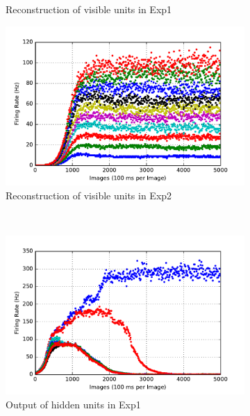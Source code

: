 \begin{figure}
\begin{subfigure}[t]{0.4\textwidth}
		\caption{Reconstruction of visible units in Exp1}
	\end{subfigure}
	\begin{subfigure}[t]{0.4\textwidth}
		\includegraphics[width=\textwidth]{pics_sdlm/15_exp_SRBM_teach_long/exp2_recon_s.pdf}
		\caption{Reconstruction of visible units in Exp2}
	\end{subfigure}\\
	\begin{subfigure}[t]{0.4\textwidth}
		\includegraphics[width=\textwidth]{pics_sdlm/15_exp_SRBM_teach_long/exp1_hid_s.pdf}
		\caption{Output of hidden units in Exp1}
	\end{subfigure}
	\begin{subfigure}[t]{0.4\textwidth}

\end{subfigure}
\end{figure}
